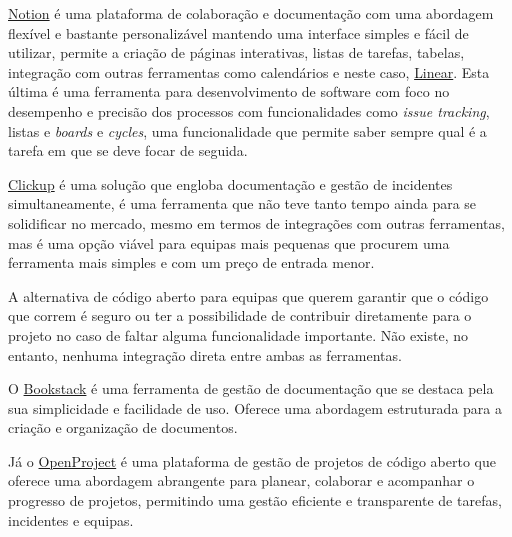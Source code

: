 
            \label{linear-notion}

                \href{https://www.notion.so/}{Notion} é uma plataforma de colaboração e documentação com uma abordagem flexível e bastante personalizável mantendo uma interface simples e fácil de utilizar, permite a criação de páginas interativas, listas de tarefas, tabelas, integração com outras ferramentas como calendários e neste caso, \href{https://linear.app/}{Linear}. Esta última é uma ferramenta para desenvolvimento de software com foco no desempenho e precisão dos processos com funcionalidades como \textit{issue tracking}, listas e \textit{boards} e \textit{cycles}, uma funcionalidade que permite saber sempre qual é a tarefa em que se deve focar de seguida.
                
            \label{clickup}
            
                \href{https://clickup.com/}{Clickup} é uma solução que engloba documentação e gestão de incidentes simultaneamente, é uma ferramenta que não teve tanto tempo ainda para se solidificar no mercado, mesmo em termos de integrações com outras ferramentas, mas é uma opção viável para equipas mais pequenas que procurem uma ferramenta mais simples e com um preço de entrada menor\cite{clickup-vs-jira}.

            \label{bookstack}
            
                A alternativa de código aberto para equipas que querem garantir que o código que correm é seguro ou ter a possibilidade de contribuir diretamente para o projeto no caso de faltar alguma funcionalidade importante. Não existe, no entanto, nenhuma integração direta entre ambas as ferramentas.
                
                O \href{https://www.bookstackapp.com/}{Bookstack} é uma ferramenta de gestão de documentação que se destaca pela sua simplicidade e facilidade de uso. Oferece uma abordagem estruturada para a criação e organização de documentos.

                Já o \href{https://www.openproject.org/}{OpenProject} é uma plataforma de gestão de projetos de código aberto que oferece uma abordagem abrangente para planear, colaborar e acompanhar o progresso de projetos, permitindo uma gestão eficiente e transparente de tarefas, incidentes e equipas.